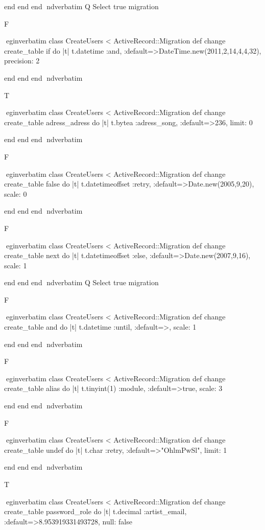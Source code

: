     end 
  end 
end
nd{verbatim}
Q
 Select true migration

F

egin{verbatim}
 class CreateUsers < ActiveRecord::Migration 
  def change 
    create_table if do |t| 
      t.datetime :and, :default=>DateTime.new(2011,2,14,4,4,32), precision: 2
    
    end 
  end 
end
nd{verbatim}

T

egin{verbatim}
 class CreateUsers < ActiveRecord::Migration 
  def change 
    create_table adress_adress do |t| 
      t.bytea :adress_song, :default=>236, limit: 0
    
    end 
  end 
end
nd{verbatim}

F

egin{verbatim}
 class CreateUsers < ActiveRecord::Migration 
  def change 
    create_table false do |t| 
      t.datetimeoffset :retry, :default=>Date.new(2005,9,20), scale: 0
    
    end 
  end 
end
nd{verbatim}

F

egin{verbatim}
 class CreateUsers < ActiveRecord::Migration 
  def change 
    create_table next do |t| 
      t.datetimeoffset :else, :default=>Date.new(2007,9,16), scale: 1
    
    end 
  end 
end
nd{verbatim}
Q
 Select true migration

F

egin{verbatim}
 class CreateUsers < ActiveRecord::Migration 
  def change 
    create_table and do |t| 
      t.datetime :until, :default=>, scale: 1
    
    end 
  end 
end
nd{verbatim}

F

egin{verbatim}
 class CreateUsers < ActiveRecord::Migration 
  def change 
    create_table alias do |t| 
      t.tinyint(1) :module, :default=>true, scale: 3
    
    end 
  end 
end
nd{verbatim}

F

egin{verbatim}
 class CreateUsers < ActiveRecord::Migration 
  def change 
    create_table undef do |t| 
      t.char :retry, :default=>"OhlmPwSl", limit: 1
    
    end 
  end 
end
nd{verbatim}

T

egin{verbatim}
 class CreateUsers < ActiveRecord::Migration 
  def change 
    create_table password_role do |t| 
      t.decimal :artist_email, :default=>8.953919331493728, null: false
    
